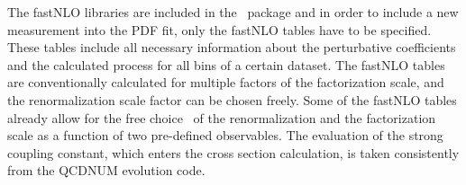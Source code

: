 \begin{description}
\begin{itemize}
The fastNLO libraries are included in the \fitter\ package
and in order to include a new measurement into the PDF fit,
only the fastNLO tables have to be specified. These tables include all
necessary information about the perturbative coefficients and the
calculated process for all bins of a certain dataset. 
%
The fastNLO tables are conventionally calculated
for multiple factors of the factorization scale, 
and the renormalization scale factor can be chosen freely.
Some of the fastNLO tables already allow for 
the free choice~\cite{Britzger:2012bs} of the renormalization and the factorization
scale as a function of two pre-defined observables.
The evaluation of the strong coupling constant, which enters
the cross section calculation, is taken consistently from the 
QCDNUM evolution code.
\end{itemize}

\end{description}

